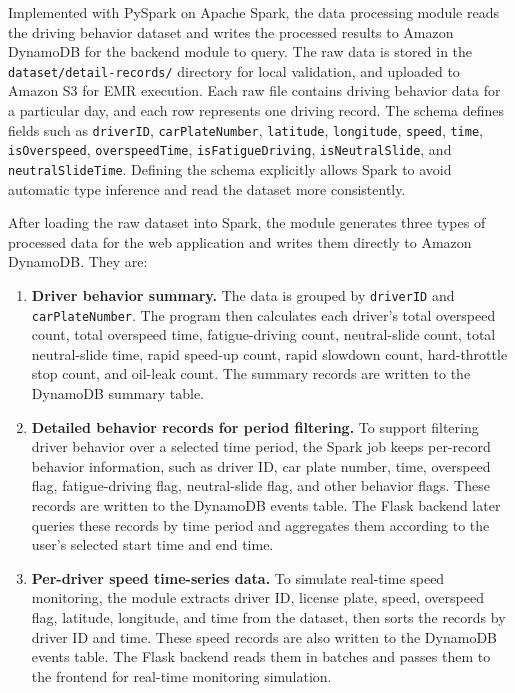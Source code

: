 \documentclass[12pt,a4paper]{article}
\begin{document}
Implemented with PySpark on Apache Spark, the data processing module reads the driving behavior dataset and writes the processed results to Amazon DynamoDB for the backend module to query. The raw data is stored in the \texttt{dataset/detail-records/} directory for local validation, and uploaded to Amazon S3 for EMR execution. Each raw file contains driving behavior data for a particular day, and each row represents one driving record. The schema defines fields such as \texttt{driverID}, \texttt{carPlateNumber}, \texttt{latitude}, \texttt{longitude}, \texttt{speed}, \texttt{time}, \texttt{isOverspeed}, \texttt{overspeedTime}, \texttt{isFatigueDriving}, \texttt{isNeutralSlide}, and \texttt{neutralSlideTime}. Defining the schema explicitly allows Spark to avoid automatic type inference and read the dataset more consistently.

After loading the raw dataset into Spark, the module generates three types of processed data for the web application and writes them directly to Amazon DynamoDB. They are:

\begin{enumerate}
    \item \textbf{Driver behavior summary.} The data is grouped by \texttt{driverID} and \texttt{carPlateNumber}. The program then calculates each driver's total overspeed count, total overspeed time, fatigue-driving count, neutral-slide count, total neutral-slide time, rapid speed-up count, rapid slowdown count, hard-throttle stop count, and oil-leak count. The summary records are written to the DynamoDB summary table.

    \item \textbf{Detailed behavior records for period filtering.} To support filtering driver behavior over a selected time period, the Spark job keeps per-record behavior information, such as driver ID, car plate number, time, overspeed flag, fatigue-driving flag, neutral-slide flag, and other behavior flags. These records are written to the DynamoDB events table. The Flask backend later queries these records by time period and aggregates them according to the user's selected start time and end time.

    \item \textbf{Per-driver speed time-series data.} To simulate real-time speed monitoring, the module extracts driver ID, license plate, speed, overspeed flag, latitude, longitude, and time from the dataset, then sorts the records by driver ID and time. These speed records are also written to the DynamoDB events table. The Flask backend reads them in batches and passes them to the frontend for real-time monitoring simulation.
\end{enumerate}
\end{document}
